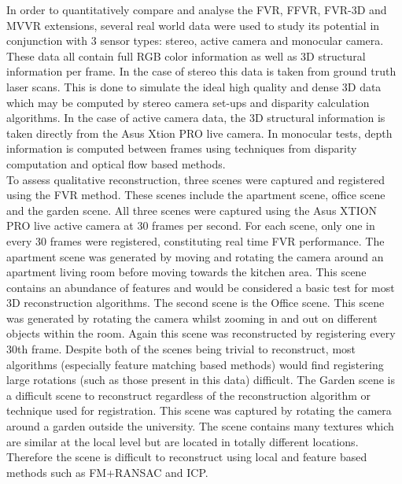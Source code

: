 
%

In order to quantitatively compare and analyse the FVR, FFVR, FVR-3D and MVVR extensions, several real world data were used to study its potential in conjunction with 3 sensor types: stereo, active camera and monocular camera. These data all contain full RGB color information as well as 3D structural information per frame. In the case of stereo this data is taken from ground truth laser scans. This is done to simulate the ideal high quality and dense 3D data which may be computed by stereo camera set-ups and disparity calculation algorithms. In the case of active camera data, the 3D structural information is taken directly from the Asus Xtion PRO live camera. In monocular tests, depth information is computed between frames using techniques from disparity computation and optical flow based methods. \\ 

To assess qualitative reconstruction, three scenes were captured and registered using the FVR method. These scenes include the apartment scene, office scene and the garden scene. All three scenes were captured using the Asus XTION PRO live active camera at 30 frames per second. For each scene, only one in every 30 frames were registered, constituting real time FVR performance. The apartment scene was generated by moving and rotating the camera around an apartment living room before moving towards the kitchen area. This scene contains an abundance of features and would be considered a basic test for most 3D reconstruction algorithms. The second scene is the Office scene. This scene was generated by rotating the camera whilst zooming in and out on different objects within the room. Again this scene was reconstructed by registering every 30th frame. Despite both of the scenes being trivial to reconstruct, most algorithms (especially feature matching based methods) would find registering large rotations (such as those present in this data) difficult. The Garden scene is a difficult scene to reconstruct regardless of the reconstruction algorithm or technique used for registration. This scene was captured by rotating the camera around a garden outside the university. The scene contains many textures which are similar at the local level but are located in totally different locations. Therefore the scene is difficult to reconstruct using local and feature based methods such as FM+RANSAC and ICP. \\


